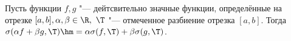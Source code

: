 
 	Пусть функции $f,g$ "--- дейтсвительно значные функции, определённые на отрезке $[a,b],\alpha,\beta\in\R,\ \T$ "--- отмеченное разбиение 
 	отрезка $[a,b]$. Тогда $\sigma(\alpha f+\beta g,\T)\hm=\alpha\sigma(f,\T)+\beta\sigma(g,\T)$.
 